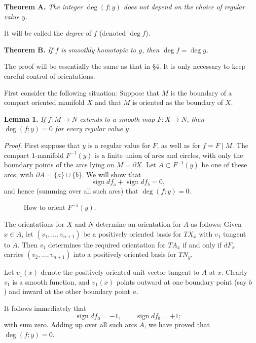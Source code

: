 
\noindent\textbf{Theorem A.} \textit{The integer $\deg(f; y)$ does not depend on the choice of regular value $y$.}

It will be called the \emph{degree} of $f$ (denoted $\deg f$).

\noindent\textbf{Theorem B.} \textit{If $f$ is smoothly homotopic to $g$, then $\deg f = \deg g$.}

The proof will be essentially the same as that in §4. It is only necessary to keep careful control of orientations.

First consider the following situation: Suppose that $M$ is the boundary of a compact oriented manifold $X$ and that $M$ is oriented as the boundary of $X$.

\noindent\textbf{Lemma 1.} \textit{If $f : M \to N$ extends to a smooth map $F : X \to N$, then $\deg(f; y) = 0$ for every regular value $y$.}

\noindent\textit{Proof.}
First suppose that $y$ is a regular value for $F$, as well as for $f = F \mid M$. The compact $1$-manifold $F^{-1}(y)$ is a finite union of arcs and circles, with only the boundary points of the arcs lying on $M = \partial X$. Let $A \subset F^{-1}(y)$ be one of these arcs, with $\partial A = \{a\} \cup \{b\}$. We will show that
\[
\operatorname{sign} df_a + \operatorname{sign} df_b = 0,
\]
and hence (summing over all such arcs) that $\deg(f; y) = 0$.

\begin{figure}[htbp]
\centering
\setcounter{figure}{8}%
\caption{How to orient $F^{-1}(y)$.}\label{fig:milnor-09}
\end{figure}

The orientations for $X$ and $N$ determine an orientation for $A$ as follows: Given $x \in A$, let $(v_1, \ldots, v_{n+1})$ be a positively oriented basis for $TX_x$ with $v_1$ tangent to $A$. Then $v_1$ determines the required orientation for $TA_x$ if and only if $dF_x$ carries $(v_2, \ldots, v_{n+1})$ into a positively oriented basis for $TN_y$.

Let $v_1(x)$ denote the positively oriented unit vector tangent to $A$ at $x$. Clearly $v_1$ is a smooth function, and $v_1(x)$ points outward at one boundary point (say $b$) and inward at the other boundary point $a$.



It follows immediately that
\[
\operatorname{sign} df_a = -1, \qquad \operatorname{sign} df_b = +1;
\]
with sum zero. Adding up over all such arcs $A$, we have proved that $\deg(f; y) = 0$.


